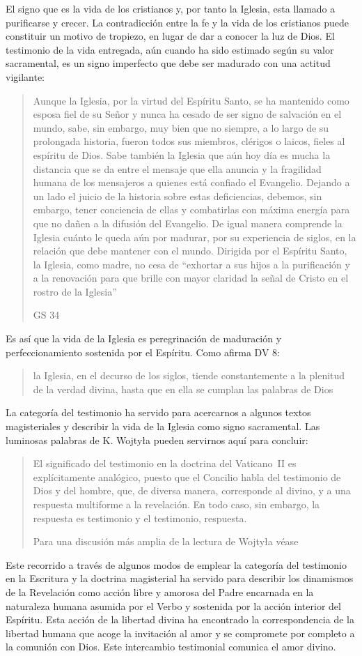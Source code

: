 El signo que es la vida de los cristianos y, por tanto la Iglesia, esta llamado
a purificarse y crecer. La contradicción entre la fe y la vida de los cristianos
puede constituir un motivo de tropiezo, en lugar de dar a conocer la luz de
Dios. El testimonio de la vida entregada, aún cuando ha sido estimado según su
valor sacramental, es un signo imperfecto que debe ser madurado con una actitud
vigilante:
\blockquote[GS 34]{Aunque la Iglesia, por la virtud del Espíritu Santo, se ha
  mantenido como esposa fiel de su Señor y nunca ha cesado de ser signo de
  salvación en el mundo, sabe, sin embargo, muy bien que no siempre, a lo largo
  de su prolongada historia, fueron todos sus miembros, clérigos o laicos,
  fieles al espíritu de Dios. Sabe también la Iglesia que aún hoy día es mucha
  la distancia que se da entre el mensaje que ella anuncia y la fragilidad
  humana de los mensajeros a quienes está confiado el Evangelio. Dejando a un
  lado el juicio de la historia sobre estas deficiencias, debemos, sin embargo,
  tener conciencia de ellas y combatirlas con máxima energía para que no dañen a
  la difusión del Evangelio. De igual manera comprende la Iglesia cuánto le
  queda aún por madurar, por su experiencia de siglos, en la relación que debe
  mantener con el mundo. Dirigida por el Espíritu Santo, la Iglesia, como madre,
  no cesa de ``exhortar a sus hijos a la purificación y a la renovación para que
  brille con mayor claridad la señal de Cristo en el rostro de la Iglesia''}.
Es así que la vida de la Iglesia es peregrinación de maduración y
perfeccionamiento sostenida por el Espíritu. Como afirma DV 8: \blockquote{la
  Iglesia, en el decurso de los siglos, tiende constantemente a la plenitud de
  la verdad divina, hasta que en ella se cumplan las palabras de Dios}.

La categoría del testimonio ha servido para acercarnos a algunos textos
magisteriales y describir la vida de la Iglesia como signo sacramental. Las
luminosas palabras de K. Wojtyła pueden servirnos aquí para concluir:
\blockquote[Para una discusión más amplia de la lectura de Wojtyła véase
{\cite[194--197]{prades2015testimonio}}]{El significado del testimonio en la
  doctrina del Vaticano~II es explícitamente analógico, puesto que el Concilio
  habla del testimonio de Dios y del hombre, que, de diversa manera, corresponde
  al divino, y a una respuesta multiforme a la revelación. En todo caso, sin
  embargo, la respuesta es testimonio y el testimonio, respuesta.}

Este recorrido a través de algunos modos de emplear la categoría del testimonio
en la Escritura y la doctrina magisterial ha servido para describir los
dinamismos de la Revelación como acción libre y amorosa del Padre encarnada en
la naturaleza humana asumida por el Verbo y sostenida por la acción interior del
Espíritu. Esta acción de la libertad divina ha encontrado la correspondencia de
la libertad humana que acoge la invitación al amor y se compromete por completo
a la comunión con Dios. Este intercambio testimonial comunica el amor divino.
